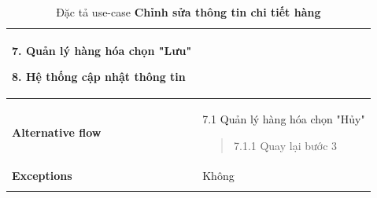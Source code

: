 \begin{longtable}{| p{} | p{} |}
                    7. Quản lý hàng hóa chọn "Lưu"
                    
                    8. Hệ thống cập nhật thông tin
                \\
                \hline
                \begin{flushleft}
                    \textbf{Alternative flow}
                \end{flushleft}
                &
                7.1 Quản lý hàng hóa chọn "Hủy"
                    \begin{quote} 
                    7.1.1 Quay lại bước 3
                    \end{quote}
                \\
                \hline
                    \textbf{Exceptions} 
                &
                    Không
                \\
                \hline
                \caption{Đặc tả use-case \textbf{Chỉnh sửa thông tin chi tiết hàng}}
            
            \end{longtable}

